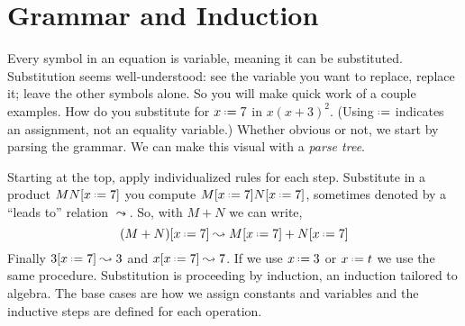 \chapter{Grammar and Induction}

Every symbol in an equation is variable, meaning it can be substituted.
Substitution seems well-understood: see the variable you want to replace,
replace it;  leave the other symbols alone.  So you will make quick work 
of a couple examples.  How do you substitute for $x\defeq 7$ in $x(x+3)^{2}$.
(Using $\defeq$ indicates an assignment, not an equality variable.)
Whether obvious or not, we start by parsing the grammar.  We can make this 
visual with a \emph{parse tree}.
\begin{center}
\end{center}
Starting at the top, apply individualized 
rules for each step.  Substitute in a product $MN[x\defeq 7]$ you compute 
$M[x\defeq 7]N[x\defeq 7]$,
sometimes denoted by a ``leads to'' relation $\leadsto$. So,
with $M+N$ we can write,
\[
    (M+N)[x\defeq 7]\leadsto M[x\defeq 7]+N[x\defeq 7]
\]
Finally $3[x\defeq 7]\leadsto 3$ and $x[x\defeq 7]\leadsto 7$.
If we use $x\defeq 3$ or $x\defeq t$ we use the same procedure.
Substitution is proceeding by induction, an induction tailored to algebra.
The base cases are how we assign constants and variables and the 
inductive steps are defined for each operation.

